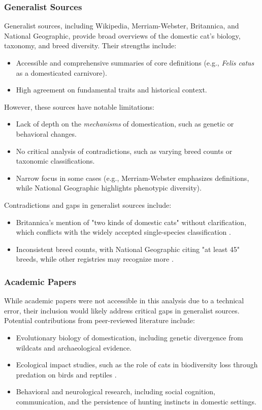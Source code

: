 \documentclass{article}
\begin{document}
\subsubsection{Generalist Sources}
Generalist sources, including Wikipedia, Merriam-Webster, Britannica, and National Geographic, provide broad overviews of the domestic cat's biology, taxonomy, and breed diversity. Their strengths include:
\begin{itemize}
    \item Accessible and comprehensive summaries of core definitions (e.g., \textit{Felis catus} as a domesticated carnivore).
    \item High agreement on fundamental traits and historical context.
\end{itemize}

However, these sources have notable limitations:
\begin{itemize}
    \item Lack of depth on the \textit{mechanisms} of domestication, such as genetic or behavioral changes.
    \item No critical analysis of contradictions, such as varying breed counts or taxonomic classifications.
    \item Narrow focus in some cases (e.g., Merriam-Webster emphasizes definitions, while National Geographic highlights phenotypic diversity).
\end{itemize}

Contradictions and gaps in generalist sources include:
\begin{itemize}
    \item Britannica's mention of "two kinds of domestic cats" without clarification, which conflicts with the widely accepted single-species classification \cite{key6}.
    \item Inconsistent breed counts, with National Geographic citing "at least 45" breeds, while other registries may recognize more \cite{key5}.
\end{itemize}

\subsubsection{Academic Papers}
While academic papers were not accessible in this analysis due to a technical error, their inclusion would likely address critical gaps in generalist sources. Potential contributions from peer-reviewed literature include:
\begin{itemize}
    \item Evolutionary biology of domestication, including genetic divergence from wildcats and archaeological evidence.
    \item Ecological impact studies, such as the role of cats in biodiversity loss through predation on birds and reptiles \cite{key7}.
    \item Behavioral and neurological research, including social cognition, communication, and the persistence of hunting instincts in domestic settings.
\end{itemize}
\end{document}
